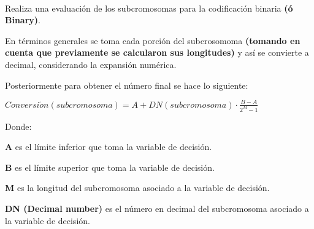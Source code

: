 \documentclass[letterpaper,10pt,english]{sphinxmanual}
\begin{document}
\begin{fulllineitems}
\label{Model/ChromosomalRepresentation/BinaryRepresentation:Model.ChromosomalRepresentation.BinaryRepresentation.evaluate_subchromosomes}~
\begin{DUlineblock}{0em}
\item[] Realiza una evaluación de los subcromosomas para la codificación binaria \textbf{(ó Binary)}.
\item[] En términos generales se toma cada porción del subcrosomoma \textbf{(tomando en 
cuenta que previamente se calcularon sus longitudes)} y así se convierte a 
decimal, considerando la expansión numérica.
\item[] Posteriormente para obtener el número final se hace lo siguiente:
\end{DUlineblock}

\begin{center}\(Conversi\acute{o}n(subcromosoma) = A + DN(subcromosoma) \cdot \frac{B - A}{2^M - 1}\)
\end{center}
\begin{DUlineblock}{0em}
\item[] Donde:
\item[]
\begin{DUlineblock}{\DUlineblockindent}
\item[] \textbf{A} es el límite inferior que toma la variable de decisión.
\item[] \textbf{B} es el límite superior que toma la variable de decisión.
\item[] \textbf{M} es la longitud del subcromosoma asociado a la variable de decisión.
\item[] \textbf{DN (Decimal number)} es el número en decimal del subcromosoma asociado a la variable de decisión.
\end{DUlineblock}
\end{DUlineblock}

\end{fulllineitems}
\end{document}
